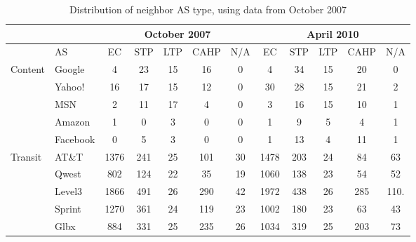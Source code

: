 \documentclass[conference]{IEEEtran}
\newcommand{\ignore}[1]{}
\newcommand{\figsize}{0.45}
\begin{document}
{\begin{table*}[h]
\small
\begin{center}
\begin{tabular}{|l|l|c|c|c|c|c||c|c|c|c|c|}
\hline
& & \multicolumn{5}{|c||}{October 2007} & \multicolumn{5}{|c|}{April 2010} \\
\hline
& AS & EC & STP & LTP & CAHP & N/A & EC & STP & LTP & CAHP & N/A \\
\hline
\multirow{5}{*}{Content} & Google & 4 & 23 & 15 & 16 & 0 &  4 & 34 & 15 & 20 & 0 \\
& Yahoo! & 16 & 17 & 15 & 12 & 0 & 30 & 28 & 15 & 21 & 2 \\
& MSN & 2 & 11 & 17 & 4 & 0 & 3 & 16 & 15 & 10 & 1 \\
& Amazon & 1 & 0 & 3 & 0 & 0 & 1 & 9 & 5 & 4 & 1 \\
& Facebook & 0 & 5 & 3 & 0 & 0 & 1 & 13 & 4 & 11 & 1 \\
\hline
\multirow{5}{*}{Transit} & AT\&T & 1376 & 241 & 25 & 101 & 30 &1478 & 203 & 24 & 84 & 63 \\
& Qwest& 802 & 124 & 22 & 35 & 19 &  1060 & 138 & 23 & 54 & 52  \\
& Level3 & 1866 & 491 & 26 & 290 & 42 &1972 & 438 & 26 & 285 & 110.\\
& Sprint& 1270 & 361 & 24 & 119 & 23 &1002 & 180 & 23 & 63 & 43 \\
& Glbx & 884 & 331 & 25 & 235 & 26 & 1034 & 319 & 25 & 203 & 73\\
\hline
\end{tabular}
\caption{Distribution of neighbor AS type, using data from October 2007}
\label{table:neighbor_types}
\end{center}
\end{table*}
}

\ignore{
\begin{figure}[tbh]
\centering
    \subfloat[Content]{
	\label{fig:type_content}
    \epsfig{file=fig/neighbor_type_content_real,width=\figsize\textwidth}
    }
    \hspace{-1mm}
    \subfloat[Transit]{
    \label{fig:type_transit}
    \epsfig{file=fig/neighbor_type_transit_real,width=\figsize\textwidth}
    }
    \caption{Distribution of neighbor types}
    \label{fig:neighbor_types}
\end{figure}
}

\ignore{
\begin{figure}[tbh]
\centering
	\label{fig:type_content}
    \epsfig{file=fig/neighbor_type_content_real,width=\figsize\textwidth}
    \caption{Content providers neighbor types}
    \label{fig:neighbor_types}
\end{figure}
}
\end{document}
